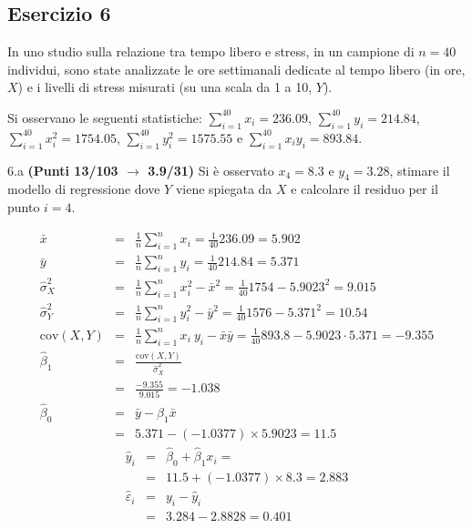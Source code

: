 \documentclass[
  11pt,
]{book}
\theoremstyle{mytheoremstyle}
\theoremstyle{mydefstyle}
\newenvironment{sol}
  {
  \begin{tcolorbox}[enhanced,breakable,arc=0.1mm,boxrule=1pt,colback=white,colframe=iblue,
  title=\bf \fontfamily{lmss}\selectfont \hspace{.5 cm} Soluzione,drop fuzzy shadow]

}{
\end{tcolorbox}
  }
\begin{document}
\subsection{Esercizio 6}\label{esercizio-6-39}

In uno studio sulla relazione tra tempo libero e stress, in un campione di \(n=40\) individui, sono state analizzate le ore settimanali dedicate al tempo libero (in ore, \(X\)) e i livelli di stress misurati (su una scala da 1 a 10, \(Y\)).

Si osservano le seguenti statistiche:
\(\sum_{i=1}^{40}x_i=236.09\), \(\sum_{i=1}^{40}y_i=214.84\),
\(\sum_{i=1}^{40}x_i^2=1754.05\), \(\sum_{i=1}^{40}y_i^2=1575.55\) e \(\sum_{i=1}^{40}x_iy_i=893.84\).

6.a \textbf{(Punti 13/103 \(\rightarrow\) 3.9/31)} Si è osservato \(x_4=8.3\) e \(y_4=3.28\), stimare il modello di regressione dove \(Y\) viene spiegata da \(X\) e calcolare il residuo per il punto \(i=4\).

\begin{sol}
\begin{eqnarray*}
           \bar x &=&\frac 1 n\sum_{i=1}^n x_i = \frac {1}{ 40 }  236.09 =  5.902 \\
           \bar y &=&\frac 1 n\sum_{i=1}^n y_i = \frac {1}{ 40 }  214.84 =  5.371 \\
           \hat\sigma_X^2&=&\frac 1 n\sum_{i=1}^n x_i^2-\bar x^2=\frac {1}{ 40 }  1754  - 5.9023 ^2= 9.015 \\
           \hat\sigma_Y^2&=&\frac 1 n\sum_{i=1}^n y_i^2-\bar y^2=\frac {1}{ 40 }  1576  - 5.371 ^2= 10.54 \\
           \text{cov}(X,Y)&=&\frac 1 n\sum_{i=1}^n x_i~y_i-\bar x\bar y=\frac {1}{ 40 }  893.8 - 5.9023 \cdot 5.371 = -9.355 \\
           \hat\beta_1 &=& \frac{\text{cov}(X,Y)}{\hat\sigma_X^2} \\
                    &=& \frac{ -9.355 }{ 9.015 }  =  -1.038 \\
           \hat\beta_0 &=& \bar y - \hat\beta_1 \bar x\\
                    &=&  5.371 - (-1.0377) \times  5.9023 = 11.5 
         \end{eqnarray*}\begin{eqnarray*}
\hat y_i &=&\hat\beta_0+\hat\beta_1 x_i=\\ 
&=& 11.5 + (-1.0377) \times 8.3 = 2.883 \\ 
\hat \varepsilon_i &=& y_i-\hat y_i\\ 
&=& 3.284 - 2.8828 = 0.401  
\end{eqnarray*}

\end{sol}
\end{document}
